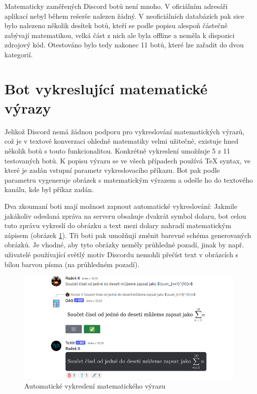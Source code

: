 \documentclass[FM]{tulthesis}
\begin{document}
	Matematicky zaměřených Discord botů není mnoho. V oficiálním adresáři aplikací nebyl během rešerše nalezen žádný. V neoficiálních databázích pak sice bylo nalezeno několik desítek botů, kteří se podle popisu alespoň částečně zabývají matematikou, velká část z nich ale byla offline a neměla k dispozici zdrojový kód. Otestováno bylo tedy nakonec 11 botů, které lze zařadit do dvou kategorií.
	
	\section{Bot vykreslující matematické výrazy}
	\label{_tag_section_texbot}

	Jelikož Discord nemá žádnou podporu pro vykreslování matematických výrazů, což je v textové konverzaci ohledně matematiky velmi užitečné, existuje hned několik botů s touto funkcionalitou. Konkrétně vykreslení umožňuje 5 z 11 testovaných botů. K popisu výrazu se ve všech případech používá TeX syntax, ve které je zadán vstupní parametr vykreslovacího příkazu. Bot pak podle parametru vygeneruje obrázek s matematickým výrazem a odešle ho do textového kanálu, kde byl příkaz zadán.
	
	Dva zkoumaní boti mají možnost zapnout automatické vykreslování: Jakmile jakákoliv odeslaná zpráva na serveru obsahuje dvakrát symbol dolaru, bot celou tuto zprávu vykreslí do obrázku a text mezi dolary nahradí matematickým zápisem (obrázek \ref{_tag_img_autotex}). Tři boti pak umožňují změnit barevné schéma generovaných obrázků. Je vhodné, aby tyto obrázky neměly průhledné pozadí, jinak by např. uživatelé používající světlý motiv Discordu nemohli přečíst text v obrázcích s bílou barvou písma (na průhledném pozadí).
	
	\begin{figure}[ht]
		\centering
		\includegraphics[width=\textwidth]{img/AutoTeX}
		\caption{Automatické vykreslení matematického výrazu}
		\label{_tag_img_autotex}
	\end{figure}
	
\end{document}
